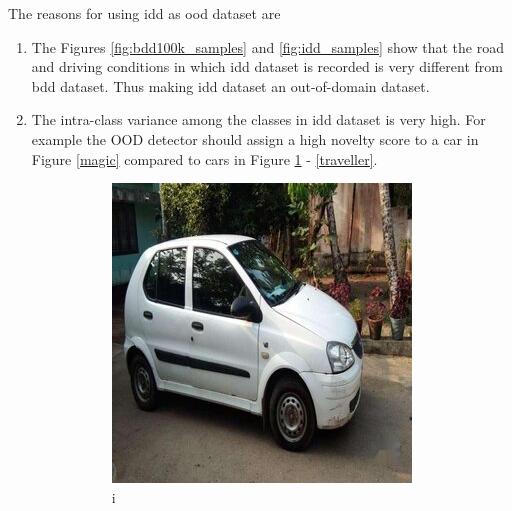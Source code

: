    The reasons for using \acrshort{idd} as \acrshort{ood} dataset are
    \begin{enumerate}
        \item The Figures \ref{fig:bdd100k_samples} and \ref{fig:idd_samples} show that the road and driving conditions in which \acrshort{idd} dataset is recorded is very different from \acrshort{bdd} dataset. Thus making \acrshort{idd} dataset an out-of-domain dataset.
        \item The intra-class variance among the classes in \acrshort{idd} dataset is very high. For example the OOD detector should assign a high novelty score to a car in Figure \ref{magic} compared to cars in Figure \ref{Indica} - \ref{traveller}.  
        
        \begin{figure}[H]
            \centering
            \begin{subfigure}[b]{0.2\textwidth}
               \includegraphics[width=\textwidth]{images/dataset_images/idd_samples/Tata_Indica.jpg}
               \caption{i}
               \label{Indica}
            \end{subfigure}
            \begin{subfigure}[b]{0.2\textwidth}

\end{subfigure}
\end{figure}
\end{enumerate}
